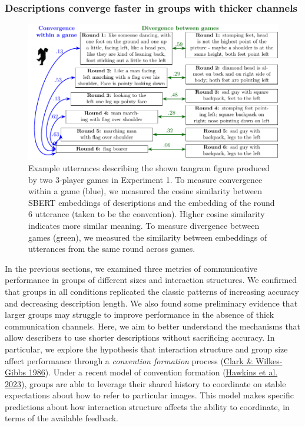 \documentclass[
  english,
]{article}
\begin{document}
\hypertarget{descriptions-converge-faster-in-groups-with-thicker-channels}{%
\subsubsection{Descriptions converge faster in groups with thicker channels}\label{descriptions-converge-faster-in-groups-with-thicker-channels}}

\begin{figure}[t!]

{\centering \includegraphics[width=1\linewidth]{sbert} 

}

\caption{Example utterances describing the shown tangram figure produced by two 3-player games in Experiment 1. To measure convergence within a game (blue), we measured the cosine similarity between SBERT embeddings of descriptions and the embedding of the round 6 utterance (taken to be the convention). Higher cosine similarity indicates more similar meaning. To measure divergence between games (green), we measured the similarity between embeddings of utterances from the same round across games.}\label{fig:sbert-diagram}
\end{figure}

In the previous sections, we examined three metrics of communicative performance in groups of different sizes and interaction structures.
We confirmed that groups in all conditions replicated the classic patterns of increasing accuracy and decreasing description length.
We also found some preliminary evidence that larger groups may struggle to improve performance in the absence of thick communication channels.
Here, we aim to better understand the mechanisms that allow describers to use shorter descriptions without sacrificing accuracy.
In particular, we explore the hypothesis that interaction structure and group size affect performance through a \emph{convention formation} process (\protect\hyperlink{ref-clark1986}{Clark \& Wilkes-Gibbs 1986}).
Under a recent model of convention formation (\protect\hyperlink{ref-hawkins2023partners}{Hawkins et al. 2023}), groups are able to leverage their shared history to coordinate on stable expectations about how to refer to particular images.
This model makes specific predictions about how interaction structure affects the ability to coordinate, in terms of the available feedback.
\end{document}

